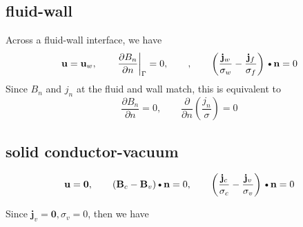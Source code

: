 \documentclass[11pt]{article}
\newcommand{\B}{\mathbf{B}}
\newcommand{\U}{\mathbf{u}}
\newcommand{\PD}{\partial}
\newcommand{\J}{\mathbf{j}}
\newcommand{\N}{\mathbf{n}}
\newcommand{\DOT}{\text{\textbullet}}
\begin{document}
\subsection{fluid-wall}
Across a fluid-wall interface, we have
\begin{equation}
  \U = \U_w
  , \qquad
  \left. \frac{\PD B_n}{\PD n} \right|_{\Gamma} = 0
  , \qquad
  , \qquad
  \left( \frac{\J_w}{\sigma_w} -\frac{\J_f}{\sigma_f} \right) \DOT \N = 0
\end{equation}
Since $B_n$ and $j_n$ at the fluid and wall match, this is equivalent to
\begin{equation}
  \frac{\PD B_n}{\PD n} = 0
  , \qquad
  \frac{\PD}{\PD n} \left( \frac{j_n}{\sigma} \right) = 0
\end{equation}


\subsection{solid conductor-vacuum}
\begin{equation}
  \U = \mathbf{0}
  , \qquad
  (\B_c -\B_v) \DOT \N = 0
  , \qquad
  \left( \frac{\J_c}{\sigma_c} -\frac{\J_v}{\sigma_v} \right) \DOT \N = 0
\end{equation}

Since $\J_v = \mathbf{0},\sigma_v = 0$, then we have
\end{document}
